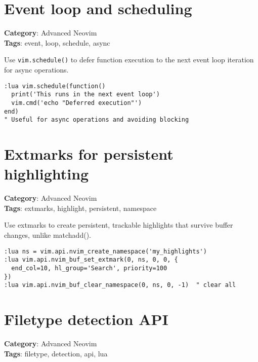 \section{Event loop and scheduling}

\textbf{Category}: Advanced Neovim\\ \textbf{Tags}: event, loop, schedule, async
\vspace{0.5cm}

Use {\footnotesize \Verb§vim.schedule()§} to defer function execution to the next event loop iteration for async operations.

\begin{Exa*}{}
\begin{Verbatim}[fontsize=\footnotesize, breaklines, breakanywhere]
:lua vim.schedule(function()
  print('This runs in the next event loop')
  vim.cmd('echo "Deferred execution"')
end)
" Useful for async operations and avoiding blocking
\end{Verbatim}
\end{Exa*}

\section{Extmarks for persistent highlighting}

\textbf{Category}: Advanced Neovim\\ \textbf{Tags}: extmarks, highlight, persistent, namespace
\vspace{0.5cm}

Use extmarks to create persistent, trackable highlights that survive buffer changes, unlike matchadd().

\begin{Exa*}{}
\begin{Verbatim}[fontsize=\footnotesize, breaklines, breakanywhere]
:lua ns = vim.api.nvim_create_namespace('my_highlights')
:lua vim.api.nvim_buf_set_extmark(0, ns, 0, 0, {
  end_col=10, hl_group='Search', priority=100
})
:lua vim.api.nvim_buf_clear_namespace(0, ns, 0, -1)  " clear all
\end{Verbatim}
\end{Exa*}

\section{Filetype detection API}

\textbf{Category}: Advanced Neovim\\ \textbf{Tags}: filetype, detection, api, lua
\vspace{0.5cm}

